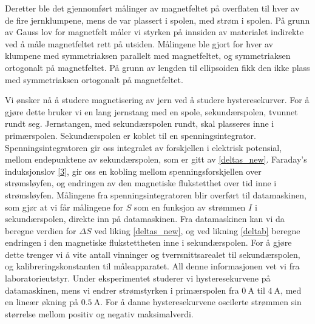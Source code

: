 \documentclass[%
 reprint,
 amsmath,amssymb,
 aps,
 norsk,
]{revtex4-1}
\begin{document}
Deretter ble det gjennomført målinger av magnetfeltet på overflaten til hver av de fire jernklumpene, mens de var plassert i spolen, med strøm i spolen. På grunn av Gauss lov for magnetfelt måler vi styrken på innsiden av materialet indirekte ved å måle magnetfeltet rett på utsiden. Målingene ble gjort for hver av klumpene med symmetriaksen parallelt med magnetfeltet, og symmetriaksen ortogonalt på magnetfeltet. På grunn av lengden til ellipsoiden fikk den ikke plass med symmetriaksen ortogonalt på magnetfeltet.
\par
Vi ønsker nå å studere magnetisering av jern ved å studere hysteresekurver. For å gjøre dette bruker vi en lang jernstang med en spole, sekundærspolen, tvunnet rundt seg. Jernstangen, med sekundærspolen rundt, skal plasseres inne i primærspolen. Sekundærspolen er koblet til en spenningsintegrator. Spenningsintegratoren gir oss integralet av forskjellen i elektrisk potensial, mellom endepunktene av sekundærspolen, som er gitt av \eqref{deltas_new}. Faraday's induksjonslov \eqref{3}, gir oss en kobling mellom spenningsforskjellen over strømsløyfen, og endringen av den magnetiske flukstetthet over tid inne i strømsløyfen. Målingene fra spenningsintegratoren blir overført til datamaskinen, som gjør at vi får målingene for $S$ som en funksjon av strømmen $I$ i sekundærspolen, direkte inn på datamaskinen. Fra datamaskinen kan vi da beregne verdien for $\Delta S$ ved liking \eqref{deltas_new}, og ved likning \eqref{deltab} beregne endringen i den magnetiske flukstettheten inne i sekundærspolen. For å gjøre dette trenger vi å vite antall vinninger og tverrsnittsarealet til sekundærspolen, og kalibreringskonstanten til måleapparatet. All denne informasjonen vet vi fra laboratorieutstyr. Under eksperimentet studerer vi hysteresekurvene på datamaskinen, mens vi endrer strømstyrken i primærspolen fra $\SI{0}{\ampere}$ til $\SI{4}{\ampere}$, med en lineær økning på $\SI{0.5}{\ampere}$. For å danne hysteresekurvene oscilerte strømmen sin størrelse mellom positiv og negativ maksimalverdi.
\end{document}
